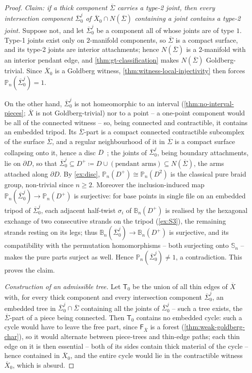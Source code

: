 \documentclass[reqno]{amsart}
\theoremstyle{definition}
\newcommand\sfT{\mathsf{T}}
\newcommand{\PB}{\mathbb{P}}
\newcommand{\BG}{\mathbb{B}}
\renewcommand{\bar}{\overline}
\numberwithin{equation}{section}
\begin{document}
\begin{proof}
\emph{Claim: if a thick component \(\bar\Sigma\) carries a
type-2 joint, then every intersection component
\(\bar\Sigma_0^j\) of \(\bar X_0\cap N(\bar\Sigma)\) containing
a joint contains a type-2 joint.} Suppose not, and let
\(\bar\Sigma_0^j\) be a component all of whose joints are of
type \(1\). Type-1 joints exist only on \(2\)-manifold
components, so \(\bar\Sigma\) is a compact surface, and its
type-2 joints are interior attachments; hence \(N(\bar\Sigma)\)
is a \(2\)-manifold with an interior pendant edge, and
\cref{thm:gt-classification} makes \(N(\bar\Sigma)\)
Goldberg-trivial. Since \(\bar X_0\) is a Goldberg witness,
\cref{thm:witness-local-injectivity} then forces
\(\PB_n(\bar\Sigma_0^j)=1\).

On the other hand, \(\bar\Sigma_0^j\) is not homeomorphic to an
interval (\cref{thm:no-interval-pieces}; \(\bar X\) is not
Goldberg-trivial) nor to a point -- a one-point component would
be all of the connected witness -- so, being connected and
contractible, it contains an embedded tripod. Its
\(\bar\Sigma\)-part is a compact connected contractible
subcomplex of the surface \(\bar\Sigma\), and a regular
neighbourhood of it in \(\bar\Sigma\) is a compact surface
collapsing onto it, hence a disc
\(D\)~\cite{RourkeSanderson}; the joints of
\(\bar\Sigma_0^j\), being boundary attachments, lie on
\(\partial D\), so that
\(\bar\Sigma_0^j\subseteq D^+\coloneqq
D\cup(\text{pendant arms})\subseteq N(\bar\Sigma)\), the arms
attached along \(\partial D\). By \cref{ex:disc},
\(\PB_n(D^+)\cong\PB_n(D^2)\) is the classical pure braid
group, non-trivial since \(n\geq2\). Moreover the
inclusion-induced map
\(\PB_n(\bar\Sigma_0^j)\to\PB_n(D^+)\) is surjective: for base
points in single file on an embedded tripod of
\(\bar\Sigma_0^j\), each adjacent half-twist \(\sigma_i\) of
\(\BG_n(D^+)\) is realised by the hexagonal exchange of two
consecutive strands on the tripod (\cref{ex:S3}), the remaining
strands resting on its legs; thus
\(\BG_n(\bar\Sigma_0^j)\to\BG_n(D^+)\) is surjective, and its
compatibility with the permutation homomorphisms -- both
surjecting onto \(\mathbb S_n\) -- makes the pure parts
surject as well. Hence \(\PB_n(\bar\Sigma_0^j)\neq1\), a
contradiction. This proves the claim.

\emph{Construction of an admissible tree.} Let \(\sfT_0\)
be the union of all thin edges of \(\bar X\) with, for every
thick component and every intersection component
\(\bar\Sigma_0^j\), an embedded tree in
\(\bar\Sigma_0^j\cap\bar\Sigma\) containing all the joints of
\(\bar\Sigma_0^j\) -- such a tree exists, the
\(\bar\Sigma\)-part of a piece being connected. Then \(\sfT_0\)
contains no embedded cycle: such a cycle would have to leave
the free part, since \(\mathsf F_{\bar X}\) is a forest
(\cref{thm:weak-goldberg-char}), so it would alternate between
piece-trees and thin-edge paths; each thin edge on it is then
essential -- both of its sides contain thick material of the
cycle -- hence contained in \(\bar X_0\), and the entire cycle
would lie in the contractible witness \(\bar X_0\), which is
absurd.


\end{proof}
\end{document}
